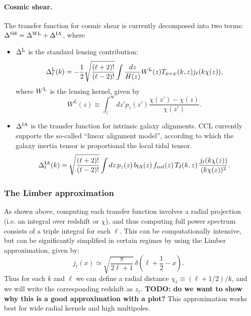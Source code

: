 \documentclass[\docopts]{\docclass}
\begin{document}
\paragraph{\bf Cosmic shear.} The transfer function for cosmic shear is currently decomposed into two terms: $\Delta^{\rm SH}=\Delta^{\rm WL}+\Delta^{\rm IA}$, where
\begin{itemize}
  \item $\Delta^{\rm L}$ is the standard lensing contribution:
        \begin{equation}
          \Delta_\ell^{\rm L}(k)=-\frac{1}{2}\sqrt{\frac{(\ell+2)!}{(\ell-2)!}}\int \frac{dz}{H(z)} W^{\rm L}(z) T_{\phi+\psi}(k,z) j_\ell(k\chi(z)),
        \end{equation}
        where $W^{\rm L}$ is the lensing kernel, given by
        \begin{equation}
          W^L(z)\equiv\int_z^\infty dz' p_z(z')\frac{\chi(z')-\chi(z)}{\chi(z')}.
        \end{equation}
  \item $\Delta^{\rm IA}$ is the transfer function for intrinsic galaxy alignments. CCL currently supports the so-called ``linear alignment model'', according to which the galaxy inertia tensor is proportional the local tidal tensor.
        \begin{equation}
          \Delta_\ell^{\rm IA}(k)=\sqrt{\frac{(\ell+2)!}{(\ell-2)!}}\int dz\,p_z(z)\,b_{\rm IA}(z)\,f_{\rm red}(z)\,T_\delta(k,z)\,\frac{j_\ell(k\chi(z))}{(k\chi(z))^2}.
        \end{equation}
\end{itemize}

\subsubsection{The Limber approximation}
As shown above, computing each transfer function involves a radial projection (i.e. an integral over redshift or $\chi$), and thus computing full power spectrum consists of a triple integral for each $\ell$. This can be computationally intensive, but can be significantly simplified in certain regimes by using the Limber approximation, given by:
\begin{equation}
 j_\ell(x)\simeq\sqrt{\frac{\pi}{2\ell+1}}\,\delta\left(\ell+\frac{1}{2}-x\right).
\end{equation}
Thus for each $k$ and $\ell$ we can define a radial distance $\chi_\ell\equiv(\ell+1/2)/k$, and we will write the corresponding redshift as $z_\ell$. {\bf TODO: do we want to show why this is a good approximation with a plot?} This approximation works best for wide radial kernels and high multipoles.
\end{document}
